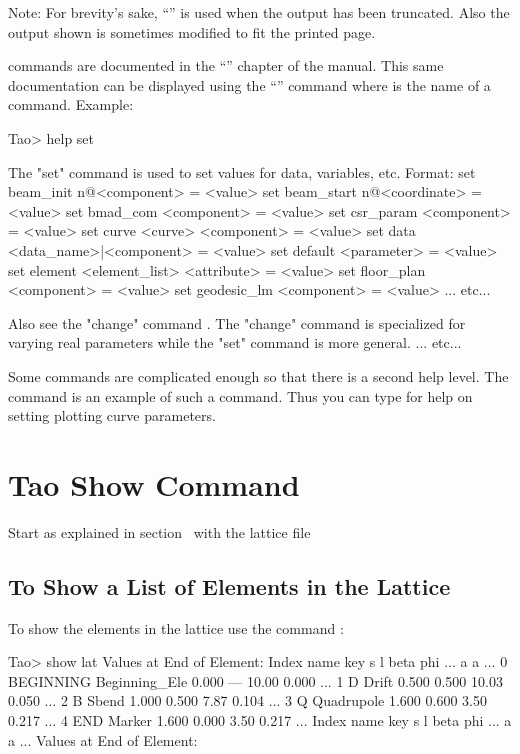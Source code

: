 \documentclass{hitec}
\newcommand{\Section}[1]{\section{#1}\vspace*{-1ex}}
\begin{document}
Note: For brevity's sake, ``'' is used when the output has been truncated. Also the output shown
is sometimes modified to fit the printed page.

\tao commands are documented in the ``'' chapter of the \tao manual.
This same documentation can be displayed using the ``'' command where
 is the name of a command. Example:
\begin{code}
Tao> help set

The "set" command is used to set values for data,
variables, etc. Format:
  set beam_init {n@}<component> = <value>
  set beam_start {n@}<coordinate> = <value>
  set bmad_com <component> = <value>
  set csr_param <component> = <value>
  set curve <curve> <component> = <value>
  set data <data_name>|<component> = <value>
  set default <parameter> = <value>
  set element <element_list> <attribute> = <value>
  set floor_plan <component> = <value>
  set geodesic_lm <component> = <value>
... etc...

Also see the "change" command . The "change" command is specialized
for varying real parameters while the "set" command is more general.
... etc...
\end{code}

Some commands are complicated enough so that there is a second help level. The  command is
an example of such a command. Thus you can type  for help on setting plotting
curve parameters.

\newpage

\Section{Tao Show Command}

Start \tao as explained in section~ with the lattice file

\subsection{To Show a List of Elements in the Lattice}

To show the elements in the lattice use the command :
\begin{code}
 Tao> show lat
      Values at End of Element:
 Index  name      key                       s       l    beta     phi ...
                                                            a       a ...
     0  BEGINNING Beginning_Ele         0.000     ---   10.00   0.000 ...
     1  D         Drift                 0.500   0.500   10.03   0.050 ...
     2  B         Sbend                 1.000   0.500    7.87   0.104 ...
     3  Q         Quadrupole            1.600   0.600    3.50   0.217 ...
     4  END       Marker                1.600   0.000    3.50   0.217 ...
 Index  name      key                       s       l    beta     phi ...
                                                            a       a ...
      Values at End of Element:
\end{code}
\end{document}

